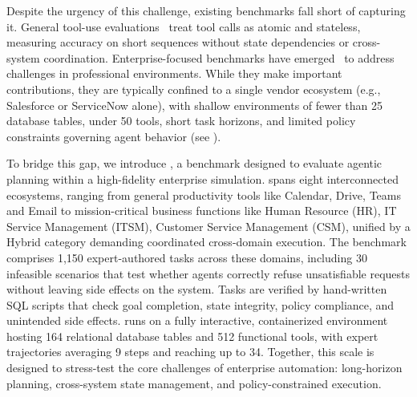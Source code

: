 Despite the urgency of this challenge, existing benchmarks fall short of capturing it. General tool-use evaluations~\citep{li-etal-2023-api, qin2024toolllm, chen2025acebenchwinsmatchpoint} treat tool calls as atomic and stateless, measuring accuracy on short sequences without state dependencies or cross-system coordination. Enterprise-focused benchmarks have emerged~\citep{workarena2024, boisvert2024workarenacompositionalplanningreasoningbased, huang-etal-2025-crmarena, huang-etal-2025-crmarena-pro, jha2025itbenchevaluatingaiagents, vishwakarma2025llmshelpworksandbox} to address challenges in professional environments. While they make important contributions, they are typically confined to a single vendor ecosystem (e.g., Salesforce or ServiceNow alone), with shallow environments of fewer than 25 database tables, under 50 tools, short task horizons, and limited policy constraints governing agent behavior (see ). 

To bridge this gap, we introduce \textbf{\ours{}}, a benchmark designed to evaluate agentic planning within a high-fidelity enterprise simulation. \ours{} spans eight interconnected ecosystems, ranging from general productivity tools like Calendar, Drive, Teams and Email to mission-critical business functions like Human Resource (HR), IT Service Management (ITSM), Customer Service Management (CSM), unified by a Hybrid category demanding coordinated cross-domain execution. The benchmark comprises 1,150 expert-authored tasks across these domains, including 30 infeasible scenarios that test whether agents correctly refuse unsatisfiable requests without leaving side effects on the system. Tasks are verified by hand-written SQL scripts that check goal completion, state integrity, policy compliance, and unintended side effects. \ours{} runs on a fully interactive, containerized environment hosting 164 relational database tables and 512 functional tools, with expert trajectories averaging 9 steps and reaching up to 34. Together, this scale is designed to stress-test the core challenges of enterprise automation: long-horizon planning, cross-system state management, and policy-constrained execution.

